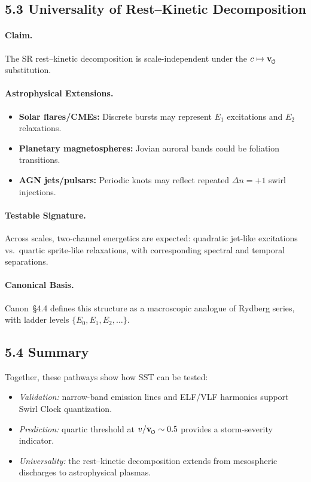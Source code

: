 \documentclass[reprint,aps,onecolumn,nofootinbib]{revtex4-2}
\newcommand{\swirlarrow}{%
    \mathchoice{\mkern-2mu\scriptstyle\boldsymbol{\circlearrowleft}}%
    {\mkern-2mu\scriptstyle\boldsymbol{\circlearrowleft}}%
    {\mkern-2mu\scriptscriptstyle\boldsymbol{\circlearrowleft}}%
    {\mkern-2mu\scriptscriptstyle\boldsymbol{\circlearrowleft}}%
}
\newcommand{\vswirl}{\mathbf{v}_{\swirlarrow}}
\newcommand{\Ce}{\vswirl}
\begin{document}
\subsection*{5.3 Universality of Rest--Kinetic Decomposition}

\paragraph{Claim.}
    The SR rest--kinetic decomposition is scale-independent under the
    $c \mapsto \Ce$ substitution.

\paragraph{Astrophysical Extensions.}
    \begin{itemize}
    \item \textbf{Solar flares/CMEs:} Discrete bursts may represent
    $E_1$ excitations and $E_2$ relaxations.
    \item \textbf{Planetary magnetospheres:} Jovian auroral bands could
    be foliation transitions.
    \item \textbf{AGN jets/pulsars:} Periodic knots may reflect repeated
    $\Delta n=+1$ swirl injections.
    \end{itemize}

\paragraph{Testable Signature.}
    Across scales, two-channel energetics are expected:
    quadratic jet-like excitations vs.\ quartic sprite-like relaxations,
    with corresponding spectral and temporal separations.

\paragraph{Canonical Basis.}
    Canon~§4.4 defines this structure as a macroscopic analogue of
    Rydberg series, with ladder levels $\{E_0,E_1,E_2,\dots\}$.

\subsection*{5.4 Summary}

Together, these pathways show how SST can be tested:
\begin{itemize}
\item \emph{Validation:} narrow-band emission lines and ELF/VLF harmonics
support Swirl Clock quantization.
\item \emph{Prediction:} quartic threshold at $v/\Ce \sim 0.5$ provides a
storm-severity indicator.
\item \emph{Universality:} the rest--kinetic decomposition extends
from mesospheric discharges to astrophysical plasmas.
\end{itemize}
\end{document}
